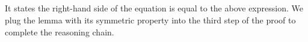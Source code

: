 \documentclass{l4proj}
\begin{document}
\begin{code}%
\>[0]%
\>[397I]\AgdaSymbol{:}\AgdaSpace{}%
\AgdaSymbol{\{}\AgdaSpace{}%
\AgdaSpace{}%
\AgdaSpace{}%
\AgdaSymbol{:}\AgdaSpace{}%
\AgdaSymbol{\}}\AgdaSpace{}%
\AgdaSpace{}%
\AgdaSymbol{\{}\AgdaSpace{}%
\AgdaSymbol{:}\AgdaSpace{}%
\AgdaSymbol{\}}\AgdaSpace{}%
\AgdaSpace{}%
\AgdaSymbol{(}\AgdaSpace{}%
\AgdaSymbol{:}\AgdaSpace{}%
\AgdaSymbol{)}\AgdaSpace{}%
\<%
\\
\>[397I][@{}l@{\AgdaIndent{0}}]%
\>[16]\AgdaSymbol{(}\AgdaSpace{}%
\AgdaSymbol{:}\AgdaSpace{}%
\AgdaSpace{}%
\AgdaSymbol{(}\AgdaSpace{}%
\AgdaSymbol{(}\AgdaSpace{}%
\AgdaSpace{}%
\AgdaSymbol{)}\AgdaSpace{}%
\AgdaSymbol{(}\AgdaSpace{}%
\AgdaSpace{}%
\AgdaOperator{\AgdaPrimitive{*}}\AgdaSpace{}%
\AgdaSymbol{))}\AgdaSpace{}%
\AgdaSymbol{)}\AgdaSpace{}%
\<%
\\
\>[0][@{}l@{\AgdaIndent{0}}]%
\>[2]\AgdaSpace{}%
\AgdaSpace{}%
\AgdaSymbol{(}\AgdaSpace{}%
\AgdaSymbol{(}\AgdaSpace{}%
\AgdaSymbol{(}\AgdaSpace{}%
\AgdaSpace{}%
\AgdaSymbol{\{}\AgdaSpace{}%
\AgdaSymbol{\})}\AgdaSpace{}%
\AgdaSymbol{))}\AgdaSpace{}%
\<%
\\
%
\>[2]\AgdaSpace{}%
\AgdaSymbol{(}\AgdaSpace{}%
\AgdaSymbol{(}\AgdaSpace{}%
\AgdaSpace{}%
\AgdaSymbol{\{}\AgdaSpace{}%
\AgdaOperator{\AgdaPrimitive{*}}\AgdaSpace{}%
\AgdaSymbol{\})}\AgdaSpace{}%
\AgdaSymbol{)}\AgdaSpace{}%
\<%
\\
%
\>[2]\AgdaSpace{}%
\AgdaSpace{}%
\AgdaSymbol{(}\AgdaSpace{}%
\AgdaSymbol{(}\AgdaSpace{}%
\AgdaSymbol{(}\AgdaSpace{}%
\AgdaSymbol{)}\AgdaSpace{}%
\AgdaSymbol{(}\AgdaSpace{}%
\AgdaSymbol{(}\AgdaSpace{}%
\AgdaSymbol{)}\AgdaSpace{}%
\AgdaSymbol{)))}\<%
\end{code}
It states the right-hand side of the equation is equal to the above expression. We plug the lemma with its symmetric property into the third step of the proof to complete the reasoning chain.
\end{document}

